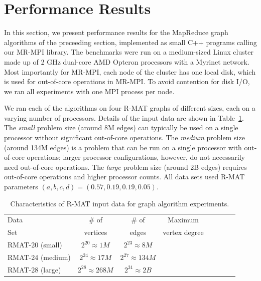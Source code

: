 \section{Performance Results}
\label{sec:results}

In this section, we present performance results for the MapReduce
graph algorithms of the preceeding section, implemented as small C++
programs calling our MR-MPI library.
The benchmarks were run on a medium-sized Linux cluster made up of 2 GHz
dual-core AMD Opteron processors with a Myrinet network.  Most importantly
for MR-MPI, each node of the cluster has one local disk, which is used
for out-of-core operations in MR-MPI.  To avoid contention for disk I/O, we 
ran all experiments with one MPI process per node.

We ran each of the algorithms on four R-MAT graphs of
different sizes, each on a varying number of processors.  Details of the
input data are shown in Table~\ref{t:rmats}.
The {\it small} problem size (around 8M edges) can typically be used
on a single processor without significant out-of-core operations.
The {\it medium} problem size (around 134M edges) is a 
problem that can be run
on a single processor with out-of-core operations; larger processor 
configurations, however, do not necessarily need out-of-core operations.
The {\it large} problem size (around 2B
edges) requires out-of-core operations and higher processor counts.
All data sets used R-MAT parameters $(a, b, c, d) = (0.57, 0.19, 0.19, 0.05)$.

\begin{table}
\begin{tabular}{|l|c|c|c|c|c|c|c|}
\hline
Data & \# of    & \# of & Maximum \\
Set  & vertices & edges & vertex degree\\
\hline
RMAT-20 (small)   &$2^{20} \approx 1M$ & $2^{23} \approx 8M$ &   \\
RMAT-24 (medium)  &$2^{24} \approx 17M$ & $2^{27} \approx 134M$ &   \\
RMAT-28 (large)   &$2^{28} \approx 268M$ & $2^{31} \approx 2B$&   \\
\hline
\end{tabular}
\caption{Characteristics of R-MAT input data for graph algorithm
experiments.}
\label{t:rmats}
\end{table}


